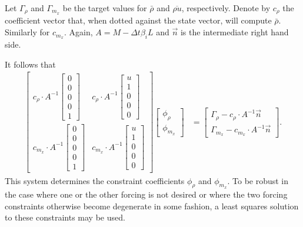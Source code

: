 \documentclass[letterpaper,11pt,nointlimits,reqno]{amsart}
\begin{document}
Let $\Gamma_\rho$ and $\Gamma_{m_x}$ be the target values for $\bar{\rho}$ and
$\overline{\rho{}u}$, respectively.  Denote by $c_\rho$ the coefficient vector
that, when dotted against the state vector, will compute $\bar{\rho}$.
Similarly for $c_{m_x}$.  Again, $A = M - \Delta{}t \beta_i L$ and $\vec{n}$ is
the intermediate right hand side.

It follows that
\begin{align}
  \begin{bmatrix}
    c_\rho \cdot A^{-1} \begin{bmatrix} 0 \\ 0 \\ 0 \\ 0 \\ 1 \end{bmatrix}
    &
    c_\rho \cdot A^{-1} \begin{bmatrix} u \\ 1 \\ 0 \\ 0 \\ 0 \end{bmatrix}
    \\
    c_{m_x} \cdot A^{-1} \begin{bmatrix} 0 \\ 0 \\ 0 \\ 0 \\ 1 \end{bmatrix}
    &
    c_{m_x} \cdot A^{-1} \begin{bmatrix} u \\ 1 \\ 0 \\ 0 \\ 0 \end{bmatrix}
  \end{bmatrix}
  \begin{bmatrix}
    \phi_\rho
    \\
    \phi_{m_x}
  \end{bmatrix}
&=
  \begin{bmatrix}
    \Gamma_\rho - c_\rho \cdot{} A^{-1} \vec{n}
    \\
    \Gamma_{m_x} - c_{m_x} \cdot{} A^{-1} \vec{n}
  \end{bmatrix}
.
\end{align}
This system determines the constraint coefficients $\phi_\rho$ and
$\phi_{m_x}$.  To be robust in the case where one or the other forcing is not
desired or where the two forcing constraints otherwise become degenerate in
some fashion, a least squares solution to these constraints may be used.


\newcommand*{\doi}[1]{\href{http://dx.doi.org/\detokenize{#1}}{doi: #1}}


\end{document}

